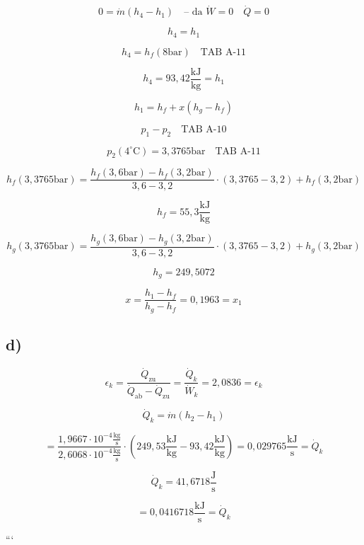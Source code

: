 \[
0 = \dot{m} (h_4 - h_1) \quad \text{-- da } \dot{W} = 0 \quad \dot{Q} = 0
\]

\[
h_4 = h_1
\]

\[
h_4 = h_f (8 \text{bar}) \quad \text{TAB A-11}
\]

\[
h_4 = 93,42 \frac{\text{kJ}}{\text{kg}} = h_1
\]

\[
h_1 = h_f + x (h_g - h_f)
\]

\[
p_1 - p_2 \quad \text{TAB A-10}
\]

\[
p_2 (4^\circ \text{C}) = 3,3765 \text{bar} \quad \text{TAB A-11}
\]

\[
h_f (3,3765 \text{bar}) = \frac{h_f (3,6 \text{bar}) - h_f (3,2 \text{bar})}{3,6 - 3,2} \cdot (3,3765 - 3,2) + h_f (3,2 \text{bar})
\]

\[
h_f = 55,3 \frac{\text{kJ}}{\text{kg}}
\]

\[
h_g (3,3765 \text{bar}) = \frac{h_g (3,6 \text{bar}) - h_g (3,2 \text{bar})}{3,6 - 3,2} \cdot (3,3765 - 3,2) + h_g (3,2 \text{bar})
\]

\[
h_g = 249,5072
\]

\[
x = \frac{h_1 - h_f}{h_g - h_f} = 0,1963 = x_1
\]

\subsection*{d)}
\[
\epsilon_k = \frac{\dot{Q}_{\text{zu}}}{\dot{Q}_{\text{ab}} - \dot{Q}_{\text{zu}}} = \frac{\dot{Q}_k}{\dot{W}_k} = 2,0836 = \epsilon_k
\]

\[
\dot{Q}_k = \dot{m} (h_2 - h_1)
\]

\[
= \frac{1,9667 \cdot 10^{-4} \frac{\text{kg}}{\text{s}}}{2,6068 \cdot 10^{-4} \frac{\text{kg}}{\text{s}}} \cdot (249,53 \frac{\text{kJ}}{\text{kg}} - 93,42 \frac{\text{kJ}}{\text{kg}}) = 0,029765 \frac{\text{kJ}}{\text{s}} = \dot{Q}_k
\]

\[
\dot{Q}_k = 41,6718 \frac{\text{J}}{\text{s}}
\]

\[
= 0,0416718 \frac{\text{kJ}}{\text{s}} = \dot{Q}_k
\]

```
